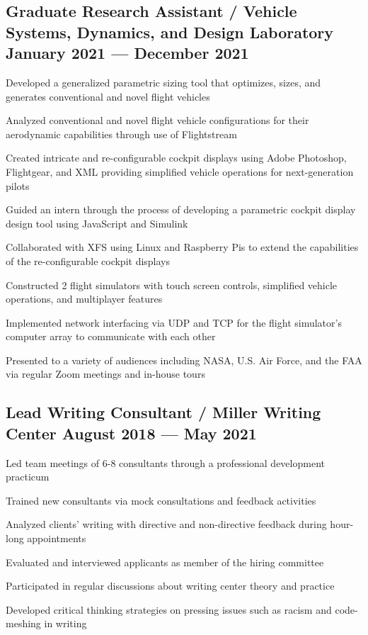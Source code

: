 \documentclass{article}
\begin{document}
\subsection{{Graduate Research Assistant / Vehicle Systems, Dynamics, and Design Laboratory \hfill January 2021 --- December 2021}}
\begin{zitemize}
    \item Developed a generalized parametric sizing tool that optimizes, sizes, and generates conventional and novel flight vehicles
    \item Analyzed conventional and novel flight vehicle configurations for their aerodynamic capabilities through use of Flightstream
    \item Created intricate and re-configurable cockpit displays using Adobe Photoshop, Flightgear, and XML providing simplified vehicle operations for next-generation
    pilots
    \item Guided an intern through the process of developing a parametric cockpit display design tool using JavaScript and Simulink
    \item Collaborated with XFS using Linux and Raspberry Pis to extend the capabilities of the re-configurable cockpit displays
    \item Constructed 2 flight simulators with touch screen controls, simplified vehicle operations, and multiplayer features
    \item Implemented network interfacing via UDP and TCP for the flight simulator's computer array to communicate with each other
    \item Presented to a variety of audiences including NASA, U.S. Air Force, and the FAA via regular Zoom meetings and in-house tours
\end{zitemize}

\subsection{{Lead Writing Consultant / Miller Writing Center \hfill August 2018 --- May 2021}}
\begin{zitemize}
    \item Led team meetings of 6-8 consultants through a professional development practicum
    \item Trained new consultants via mock consultations and feedback activities
    \item Analyzed clients' writing with directive and non-directive feedback during hour-long appointments
    \item Evaluated and interviewed applicants as member of the hiring committee
    \item Participated in regular discussions about writing center theory and practice
    \item Developed critical thinking strategies on pressing issues such as racism and code-meshing in writing
\end{zitemize}
\end{document}
